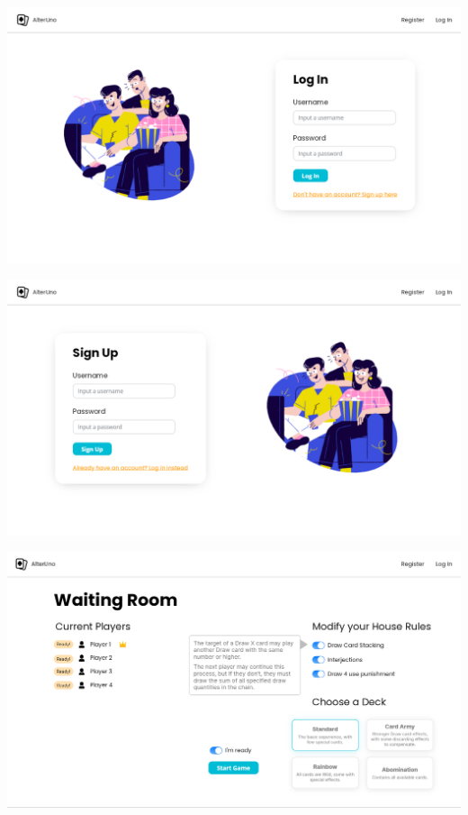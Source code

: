 \begin{center}
  \includegraphics[width=1\textwidth]{img/Mockup Log In}
   \label{fig:loginmockup}
\end{center}

\begin{center}
  \includegraphics[width=1\textwidth]{img/Mockup Sign Up}
   \label{fig:signupmockup}
\end{center}


\begin{center}
  \includegraphics[width=1\textwidth]{img/Mockup Waiting Room}
   \label{fig:waitingroommockup}
\end{center}

